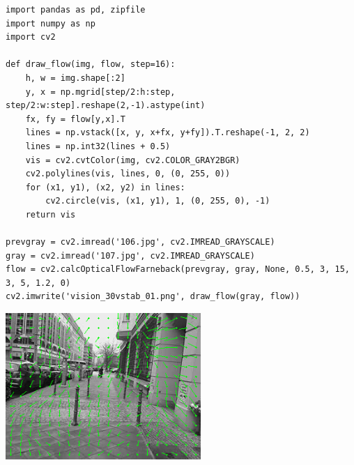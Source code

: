 \documentclass[12pt,fleqn]{article}\usepackage{../../common}
\begin{document}
\begin{verbatim}
import pandas as pd, zipfile
import numpy as np
import cv2

def draw_flow(img, flow, step=16):
    h, w = img.shape[:2]
    y, x = np.mgrid[step/2:h:step, step/2:w:step].reshape(2,-1).astype(int)
    fx, fy = flow[y,x].T
    lines = np.vstack([x, y, x+fx, y+fy]).T.reshape(-1, 2, 2)
    lines = np.int32(lines + 0.5)
    vis = cv2.cvtColor(img, cv2.COLOR_GRAY2BGR)
    cv2.polylines(vis, lines, 0, (0, 255, 0))
    for (x1, y1), (x2, y2) in lines:
        cv2.circle(vis, (x1, y1), 1, (0, 255, 0), -1)
    return vis

prevgray = cv2.imread('106.jpg', cv2.IMREAD_GRAYSCALE)
gray = cv2.imread('107.jpg', cv2.IMREAD_GRAYSCALE)
flow = cv2.calcOpticalFlowFarneback(prevgray, gray, None, 0.5, 3, 15, 3, 5, 1.2, 0)
cv2.imwrite('vision_30vstab_01.png', draw_flow(gray, flow))
\end{verbatim}


\includegraphics[width=20em]{vision_30vstab_01.png}
\end{document}
